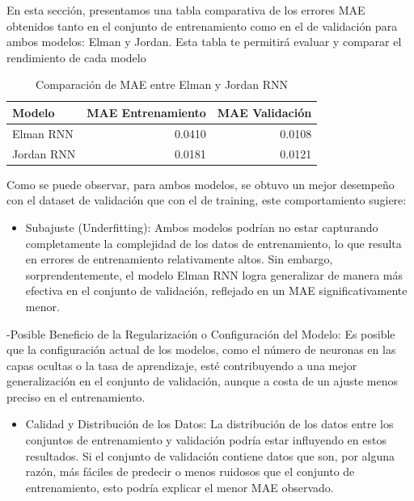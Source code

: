 \documentclass[
]{book}
\providecommand{\tightlist}{%
  \setlength{\itemsep}{0pt}\setlength{\parskip}{0pt}}
\begin{document}
En esta sección, presentamos una tabla comparativa de los errores MAE obtenidos tanto en el conjunto de entrenamiento como en el de validación para ambos modelos: Elman y Jordan. Esta tabla te permitirá evaluar y comparar el rendimiento de cada modelo

\begin{table}

\caption{\label{tab:rnn-9}Comparación de MAE entre Elman y Jordan RNN}
\centering
\begin{tabular}[t]{l|r|r}
\hline
Modelo & MAE Entrenamiento & MAE Validación\\
\hline
Elman RNN & 0.0410 & 0.0108\\
\hline
Jordan RNN & 0.0181 & 0.0121\\
\hline
\end{tabular}
\end{table}

Como se puede observar, para ambos modelos, se obtuvo un mejor desempeño con el dataset de validación que con el de training, este comportamiento sugiere:

\begin{itemize}
\tightlist
\item
  Subajuste (Underfitting): Ambos modelos podrían no estar capturando completamente la complejidad de los datos de entrenamiento, lo que resulta en errores de entrenamiento relativamente altos. Sin embargo, sorprendentemente, el modelo Elman RNN logra generalizar de manera más efectiva en el conjunto de validación, reflejado en un MAE significativamente menor.
\end{itemize}

-Posible Beneficio de la Regularización o Configuración del Modelo: Es posible que la configuración actual de los modelos, como el número de neuronas en las capas ocultas o la tasa de aprendizaje, esté contribuyendo a una mejor generalización en el conjunto de validación, aunque a costa de un ajuste menos preciso en el entrenamiento.

\begin{itemize}
\tightlist
\item
  Calidad y Distribución de los Datos: La distribución de los datos entre los conjuntos de entrenamiento y validación podría estar influyendo en estos resultados. Si el conjunto de validación contiene datos que son, por alguna razón, más fáciles de predecir o menos ruidosos que el conjunto de entrenamiento, esto podría explicar el menor MAE observado.
\end{itemize}
\end{document}
